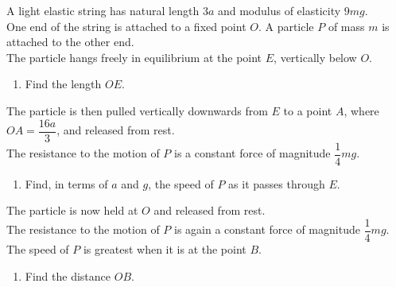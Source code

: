 \documentclass[leqno]{article}
\begin{document}
\begin{enumerate}[
  label=\textbf{\arabic*.},
  leftmargin=*,
  topsep=0pt,
  partopsep=0pt,
  parsep=0pt
]
\newpage

\questionitem

A light elastic string has natural length $3a$ and modulus of elasticity $9mg$. \\
One end of the string is attached to a fixed point $O$. A particle $P$ of mass $m$ is attached to the other end. \\
The particle hangs freely in equilibrium at the point $E$, vertically below $O$. \\
\begin{enumerate}[label=\textbf{(\alph*)}]
  \item Find the length $OE$.  \\
\end{enumerate}
The particle is then pulled vertically downwards from $E$ to a point $A$, where $OA = \dfrac{16a}{3}$, and released from rest. \\
The resistance to the motion of $P$ is a constant force of magnitude $\dfrac{1}{4}mg$. \\
\begin{enumerate}[label=\textbf{(\alph*)}, resume]
  \item Find, in terms of $a$ and $g$, the speed of $P$ as it passes through $E$.  \\
\end{enumerate}
The particle is now held at $O$ and released from rest. \\
The resistance to the motion of $P$ is again a constant force of magnitude $\dfrac{1}{4}mg$. \\
The speed of $P$ is greatest when it is at the point $B$. \\
\begin{enumerate}[label=\textbf{(\alph*)}, resume]
  \item Find the distance $OB$.  \\
\end{enumerate}

\newpage

\questionitem

\begin{figure}[H]
    \centering
{}
\end{figure}
\end{enumerate}
\end{document}
